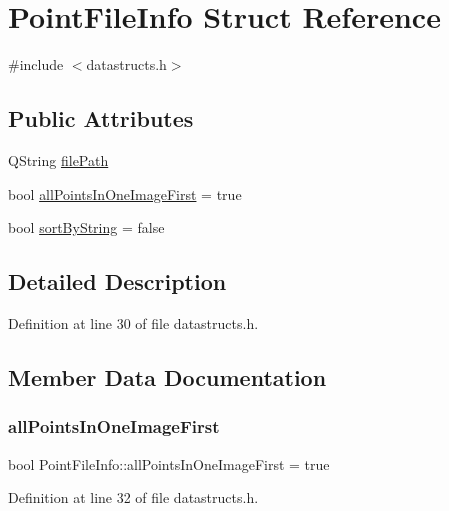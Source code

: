 \hypertarget{struct_point_file_info}{}\section{Point\+File\+Info Struct Reference}
\label{struct_point_file_info}


{\ttfamily \#include $<$datastructs.\+h$>$}

\subsection*{Public Attributes}
\begin{DoxyCompactItemize}
\item 
Q\+String \mbox{\hyperlink{struct_point_file_info_a40c7f6eb65abb4cd4f0a51b17e6df1f0}{file\+Path}}
\item 
bool \mbox{\hyperlink{struct_point_file_info_ad4deaa57cadc5f809362f65da473099b}{all\+Points\+In\+One\+Image\+First}} = true
\item 
bool \mbox{\hyperlink{struct_point_file_info_a48b211df434193da7280b689bd2d39ef}{sort\+By\+String}} = false
\end{DoxyCompactItemize}


\subsection{Detailed Description}


Definition at line 30 of file datastructs.\+h.



\subsection{Member Data Documentation}
\mbox{\label{struct_point_file_info_ad4deaa57cadc5f809362f65da473099b}} 
\subsubsection{\texorpdfstring{allPointsInOneImageFirst}{allPointsInOneImageFirst}}
{\footnotesize\ttfamily bool Point\+File\+Info\+::all\+Points\+In\+One\+Image\+First = true}



Definition at line 32 of file datastructs.\+h.

